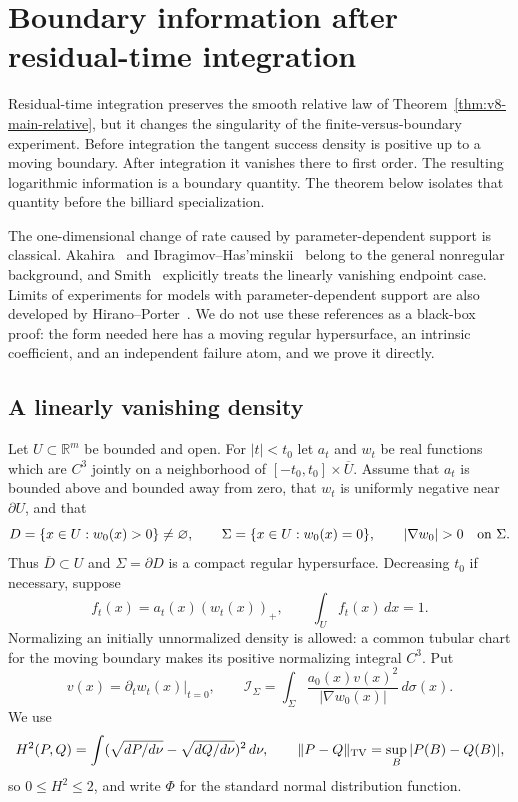 \section{Boundary information after residual-time integration}
\label{sec:v17-boundary-information}

Residual-time integration preserves the smooth relative law of
Theorem~\ref{thm:v8-main-relative}, but it changes the singularity of the
finite-versus-boundary experiment.  Before integration the tangent success
density is positive up to a moving boundary.  After integration it vanishes
there to first order.  The resulting logarithmic information is a boundary
quantity.  The theorem below isolates that quantity before the billiard
specialization.

The one-dimensional change of rate caused by parameter-dependent support is
classical.  Akahira~\cite{Akahira1975a,Akahira1975b} and
Ibragimov--Has'minskii~\cite{IbragimovHasminskii} belong to the general
nonregular background, and Smith~\cite{Smith1985} explicitly treats the
linearly vanishing endpoint case.  Limits of experiments for models with
parameter-dependent support are also developed by
Hirano--Porter~\cite{HiranoPorter}.  We do not use these references as a
black-box proof: the form needed here has a moving regular hypersurface, an
intrinsic coefficient, and an independent failure atom, and we prove it
directly.

\subsection{A linearly vanishing density}
Let $U\subset\mathbb R^m$ be bounded and open.  For $|t|<t_0$ let $a_t$
and $w_t$ be real functions which are $C^3$ jointly on a neighborhood of
$[-t_0,t_0]\times\overline U$.  Assume that $a_t$ is bounded above and
bounded away from zero, that $w_t$ is uniformly negative near
$\partial U$, and that
\[
 D=\{x\in U:w_0(x)>0\}\ne\varnothing,\qquad
 \Sigma=\{x\in U:w_0(x)=0\},\qquad
 |\nabla w_0|>0\quad\hbox{on }\Sigma.
\]
Thus $\overline D\subset U$ and $\Sigma=\partial D$ is a compact regular
hypersurface.  Decreasing $t_0$ if necessary, suppose
\begin{equation}\label{eq:v17-linear-density}
 f_t(x)=a_t(x)(w_t(x))_+,
 \qquad \int_U f_t(x)\,dx=1.
\end{equation}
Normalizing an initially unnormalized density is allowed: a common tubular
chart for the moving boundary makes its positive normalizing integral
$C^3$.  Put
\begin{equation}\label{eq:v17-boundary-form}
 v(x)=\left.\partial_t w_t(x)\right|_{t=0},\qquad
 \mathcal I_\Sigma=
 \int_\Sigma\frac{a_0(x)v(x)^2}{|\nabla w_0(x)|}\,d\sigma(x).
\end{equation}
We use
\[
 H^2(P,Q)=\int(\sqrt{dP/d\nu}-\sqrt{dQ/d\nu})^2\,d\nu,
 \qquad \|P-Q\|_{\rm TV}=\sup_B|P(B)-Q(B)|,
\]
so $0\le H^2\le2$, and write $\Phi$ for the standard normal distribution
function.

